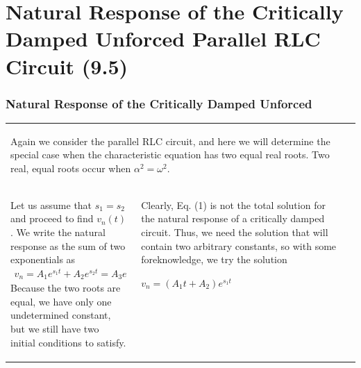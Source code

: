 \documentclass[aspectratio=169]{beamer}
\begin{document}
\section{Natural Response of the Critically Damped Unforced Parallel RLC Circuit (9.5)}
\begin{frame}[fragile]
	\frametitle{Natural Response of the Critically Damped Unforced}
\begin{tabular}{ll}
	\begin{columns}
		\begin{column}{1\textwidth}  %
Again we consider the parallel RLC circuit, and here we will determine the special case when the
characteristic equation has two equal real roots. Two real, equal roots occur when $\alpha^2=\omega^2$. \newline
		\end{column}
	\end{columns}\\
	\begin{columns}
		\begin{column}{.5\textwidth}  %
\small		Let us assume that $s_1=s_2$ and proceed to find $v_n(t)$. We write the natural response as the sum of two
exponentials as
\begin{eqnarray} v_n=A_1e^{s_1t}+A_2e^{s_2t}=A_3e^{s_1t} \end{eqnarray}
Because the two roots are equal, we have only one undetermined constant, but we
still have two initial conditions to satisfy. 
		\end{column}

		\begin{column}{.5\textwidth}  %
		
\small		Clearly, Eq. (1) is not the total solution for the natural
response of a critically damped circuit. \newline \newline
		Thus, we need the solution that will contain two arbitrary constants, so
with some foreknowledge, we try the solution
\begin{center} $v_n=(A_1t+A_2)e^{s_1t}$ \end{center}
		\end{column}
	\end{columns}
	
\end{tabular}	
\end{frame}
\end{document}
